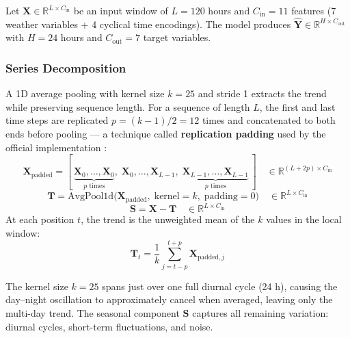 Let $\mathbf{X} \in \mathbb{R}^{L \times C_{\text{in}}}$ be an input window of
$L = 120$ hours and $C_{\text{in}} = 11$ features (7 weather variables + 4
cyclical time encodings). The model produces
$\mathbf{\hat{Y}} \in \mathbb{R}^{H \times C_{\text{out}}}$ with $H = 24$ hours
and $C_{\text{out}} = 7$ target variables.

\subsubsection{Series Decomposition}

A 1D average pooling with kernel size $k = 25$ and stride 1 extracts the trend
while preserving sequence length. For a sequence of length $L$, the first and
last time steps are replicated $p = (k-1)/2 = 12$ times and concatenated to both
ends before pooling --- a technique called \textbf{replication padding} used by
the official implementation \citep{zeng2023dlinear}:
%
\begin{equation}
\mathbf{X}_{\text{padded}} = [\,\underbrace{\mathbf{X}_0, \ldots, \mathbf{X}_0}_{p \text{ times}},\;
        \mathbf{X}_0, \ldots, \mathbf{X}_{L-1},\;
        \underbrace{\mathbf{X}_{L-1}, \ldots, \mathbf{X}_{L-1}}_{p \text{ times}}\,]
        \quad \in \mathbb{R}^{(L + 2p) \times C_{\text{in}}}
\end{equation}
%
\begin{equation}
\mathbf{T} = \text{AvgPool1d}\big(\mathbf{X}_{\text{padded}},\;
            \text{kernel}=k,\; \text{padding}=0\big)
            \quad \in \mathbb{R}^{L \times C_{\text{in}}}
\end{equation}
%
\begin{equation}
\mathbf{S} = \mathbf{X} - \mathbf{T} \quad \in \mathbb{R}^{L \times C_{\text{in}}}
\end{equation}
%
At each position $t$, the trend is the unweighted mean of the $k$ values in the
local window:
%
\begin{equation}
\mathbf{T}_t = \frac{1}{k} \sum_{j=t-p}^{t+p} \mathbf{X}_{\text{padded}, j}
\end{equation}

The kernel size $k=25$ spans just over one full diurnal cycle (24 h), causing
the day--night oscillation to approximately cancel when averaged, leaving only
the multi-day trend. The seasonal component $\mathbf{S}$ captures all remaining
variation: diurnal cycles, short-term fluctuations, and noise.

